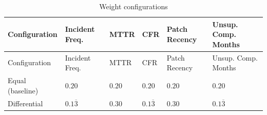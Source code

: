 \documentclass[
  12pt,
  letterpaper,
  12pt,
  oneside,
  english,
  onehalfspacing,
  headsepline]{MastersDoctoralThesis}
\begin{document}
\begin{samepage}
\footnotesize

\begin{longtable}[]{@{}
  >{\raggedright\arraybackslash}p{}
  >{\raggedleft\arraybackslash}p{}
  >{\raggedleft\arraybackslash}p{}
  >{\raggedleft\arraybackslash}p{}
  >{\raggedleft\arraybackslash}p{}
  >{\raggedleft\arraybackslash}p{}@{}}
\caption{Weight configurations}\label{tbl-weights}\tabularnewline
\toprule\noalign{}
\begin{minipage}[b]{\linewidth}\raggedright
Configuration
\end{minipage} & \begin{minipage}[b]{\linewidth}\raggedleft
Incident Freq.
\end{minipage} & \begin{minipage}[b]{\linewidth}\raggedleft
MTTR
\end{minipage} & \begin{minipage}[b]{\linewidth}\raggedleft
CFR
\end{minipage} & \begin{minipage}[b]{\linewidth}\raggedleft
Patch Recency
\end{minipage} & \begin{minipage}[b]{\linewidth}\raggedleft
Unsup. Comp. Months
\end{minipage} \\
\midrule\noalign{}
\endfirsthead
\toprule\noalign{}
\begin{minipage}[b]{\linewidth}\raggedright
Configuration
\end{minipage} & \begin{minipage}[b]{\linewidth}\raggedleft
Incident Freq.
\end{minipage} & \begin{minipage}[b]{\linewidth}\raggedleft
MTTR
\end{minipage} & \begin{minipage}[b]{\linewidth}\raggedleft
CFR
\end{minipage} & \begin{minipage}[b]{\linewidth}\raggedleft
Patch Recency
\end{minipage} & \begin{minipage}[b]{\linewidth}\raggedleft
Unsup. Comp. Months
\end{minipage} \\
\midrule\noalign{}
\endhead
\bottomrule\noalign{}
\endlastfoot
Equal (baseline) & \(0.20\) & \(0.20\) & \(0.20\) & \(0.20\) &
\(0.20\) \\
Differential & \(0.1\overline{3}\) & \(0.30\) & \(0.1\overline{3}\) &
\(0.30\) & \(0.1\overline{3}\) \\
\end{longtable}

\end{samepage}
\end{document}
